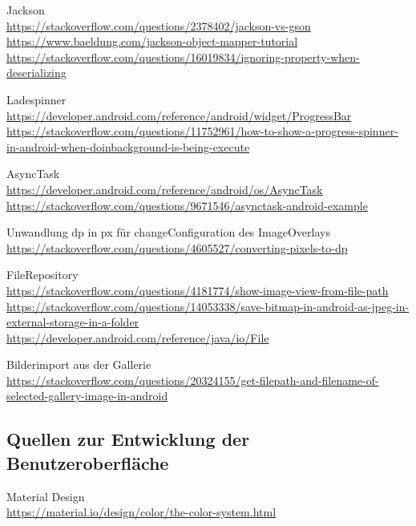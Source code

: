 Jackson\\
\url{https://stackoverflow.com/questions/2378402/jackson-vs-gson}\\
\url{https://www.baeldung.com/jackson-object-mapper-tutorial}\\
\url{https://stackoverflow.com/questions/16019834/ignoring-property-when-deserializing}

Ladespinner\\
\url{https://developer.android.com/reference/android/widget/ProgressBar}\\
\url{https://stackoverflow.com/questions/11752961/how-to-show-a-progress-spinner-in-android-when-doinbackground-is-being-execute}

AsyncTask\\
\url{https://developer.android.com/reference/android/os/AsyncTask}\\
\url{https://stackoverflow.com/questions/9671546/asynctask-android-example}

Unwandlung dp in px für changeConfiguration des ImageOverlays\\
\url{https://stackoverflow.com/questions/4605527/converting-pixels-to-dp}

FileRepository\\
\url{https://stackoverflow.com/questions/4181774/show-image-view-from-file-path}\\
\url{https://stackoverflow.com/questions/14053338/save-bitmap-in-android-as-jpeg-in-external-storage-in-a-folder}\\
\url{https://developer.android.com/reference/java/io/File}

Bilderimport aus der Gallerie\\
\url{https://stackoverflow.com/questions/20324155/get-filepath-and-filename-of-selected-gallery-image-in-android}

\subsection{Quellen zur Entwicklung der Benutzeroberfläche}
Material Design\\
\url{https://material.io/design/color/the-color-system.html}\\

